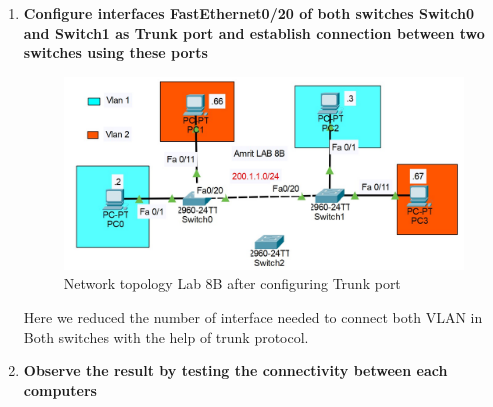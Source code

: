 \documentclass[a4paper,11pt]{article}
\begin{document}
\begin{enumerate}

    \item\textbf{ Configure interfaces FastEthernet0/20 of both switches Switch0 and Switch1 as Trunk
              port and establish connection between two switches using these ports}



          \begin{figure}[H]
              \centering
              \includegraphics[scale=0.67,cframe=blue 0.5pt 3pt]{./FIG/Lab8B1.jpg}
              \caption{Network topology Lab 8B after configuring Trunk port }
          \end{figure}


          Here we reduced the number of interface needed to connect both VLAN in Both switches with the help of trunk protocol.





    \item\textbf{  Observe the result by testing the connectivity between each computers}



\end{enumerate}
\end{document}
